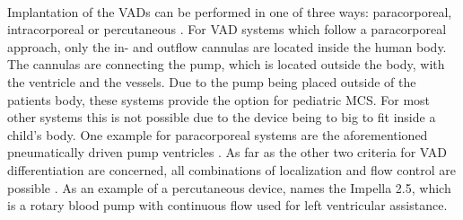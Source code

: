 \\Implantation of the VADs can be performed in one of three ways: paracorporeal, intracorporeal or percutaneous \cite{VAD7}. For VAD systems which follow a paracorporeal approach, only the in- and outflow cannulas are located inside the human body. The cannulas are connecting the pump, which is located outside the body, with the ventricle and the vessels. Due to the pump being placed outside of the patients body, these systems provide the option for pediatric MCS. For most other systems this is not possible due to the device being to big to fit inside a child's body. \cite{VAD10} One example for paracorporeal systems are the aforementioned pneumatically driven pump ventricles \cite{VAD1}. As far as the other two criteria for VAD differentiation are concerned, all combinations of localization and flow control are possible \cite{VAD10}. As an example of a percutaneous device, \cite{VAD7} names the Impella 2.5, which is a rotary blood pump with continuous flow used for left ventricular assistance.

